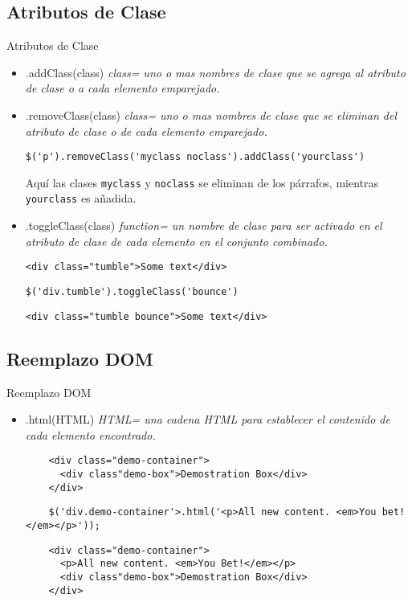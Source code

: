 \subsection{Atributos de Clase} %

\begin{frame}[fragile]{Atributos de Clase} %
\begin{itemize}
    \item .addClass(class) \textit{ class= uno o mas nombres de clase que se agrega al atributo de clase o a cada elemento emparejado.}
    \item .removeClass(class) \textit{ class= uno o mas nombres de clase que se eliminan del atributo de clase o de cada elemento emparejado.}
\begin{lstlisting}
$('p').removeClass('myclass noclass').addClass('yourclass')
\end{lstlisting}
Aquí las clases \texttt{myclass} y \texttt{noclass} se eliminan de los
párrafos, mientras \texttt{yourclass} es añadida.
    \item .toggleClass(class) \textit{ function= un nombre de clase para ser activado en el atributo de clase de cada elemento en el conjunto combinado.}
\begin{lstlisting}
<div class="tumble">Some text</div>
\end{lstlisting}
\begin{lstlisting}
$('div.tumble').toggleClass('bounce')
\end{lstlisting}
\begin{lstlisting}
<div class="tumble bounce">Some text</div>
\end{lstlisting}
\end{itemize}
\end{frame}

\subsection{Reemplazo DOM} %

\begin{frame}[fragile]{Reemplazo DOM} %
\begin{itemize}
    \item .html(HTML) \textit{ HTML= una cadena HTML para establecer el contenido de cada elemento encontrado.} 
    \begin{lstlisting}
    <div class="demo-container">
      <div class"demo-box">Demostration Box</div>
    </div>
    \end{lstlisting}
    \begin{lstlisting}
    $('div.demo-container'>.html('<p>All new content. <em>You bet!</em></p>'));
    \end{lstlisting}
    \begin{lstlisting}
    <div class="demo-container">
      <p>All new content. <em>You Bet!</em></p>
      <div class"demo-box">Demostration Box</div>
    </div>
    \end{lstlisting}
\end{itemize}
\end{frame}

